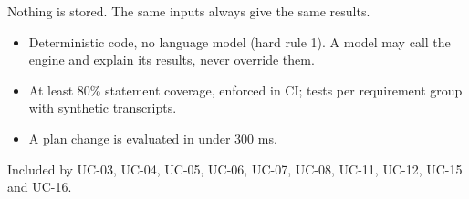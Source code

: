 Nothing is stored. The same inputs always give the same results.

\begin{itemize}
  \item Deterministic code, no language model (hard rule 1). A model may call the engine and explain its results, never
        override them.
  \item At least 80\% statement coverage, enforced in CI; tests per requirement group with synthetic transcripts.
  \item A plan change is evaluated in under 300 ms.
\end{itemize}

Included by UC-03, UC-04, UC-05, UC-06, UC-07, UC-08, UC-11, UC-12, UC-15 and UC-16.
